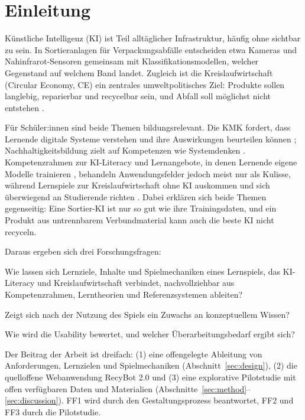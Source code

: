 \documentclass[sigconf,nonacm]{acmart}
\begin{document}
\section{Einleitung}
Künstliche Intelligenz (KI) ist Teil alltäglicher Infrastruktur, häufig ohne sichtbar zu sein. In Sortieranlagen für Verpackungsabfälle entscheiden etwa Kameras und Nahinfrarot-Sensoren gemeinsam mit Klassifikationsmodellen, welcher Gegenstand auf welchem Band landet. Zugleich ist die Kreislaufwirtschaft (Circular Economy, CE) ein zentrales umweltpolitisches Ziel: Produkte sollen langlebig, reparierbar und recycelbar sein, und Abfall soll möglichst nicht entstehen \cite{emf2013,eu2020}.

Für Schüler:innen sind beide Themen bildungsrelevant. Die KMK fordert, dass Lernende digitale Systeme verstehen und ihre Auswirkungen beurteilen können \cite{kmk2016}; Nachhaltigkeitsbildung zielt auf Kompetenzen wie Systemdenken \cite{wiek2011}. Kompetenzrahmen zur KI-Literacy \cite{long2020,touretzky2019,unesco2024} und Lernangebote, in denen Lernende eigene Modelle trainieren \cite{carney2020,lane2021,codeorg2019}, behandeln Anwendungsfelder jedoch meist nur als Kulisse, während Lernspiele zur Kreislaufwirtschaft ohne KI auskommen und sich überwiegend an Studierende richten \cite{lange2022}. Dabei erklären sich beide Themen gegenseitig: Eine Sortier-KI ist nur so gut wie ihre Trainingsdaten, und ein Produkt aus untrennbarem Verbundmaterial kann auch die beste KI nicht recyceln.

Daraus ergeben sich drei Forschungsfragen:

\begin{description}[leftmargin=2.4em,labelwidth=2em,labelsep=0.4em,itemsep=2pt]
\item[FF1] Wie lassen sich Lernziele, Inhalte und Spielmechaniken eines Lernspiels, das KI-Literacy und Kreislaufwirtschaft verbindet, nachvollziehbar aus Kompetenzrahmen, Lerntheorien und Referenzsystemen ableiten?
\item[FF2] Zeigt sich nach der Nutzung des Spiels ein Zuwachs an konzeptuellem Wissen?
\item[FF3] Wie wird die Usability bewertet, und welcher Über\-arbeitungs\-bedarf ergibt sich?
\end{description}

Der Beitrag der Arbeit ist dreifach: (1) eine offengelegte Ableitung von Anforderungen, Lernzielen und Spielmechaniken (Abschnitt~\ref{sec:design}), (2) die quelloffene Webanwendung RecyBot 2.0 und (3) eine explorative Pilotstudie mit offen verfügbaren Daten und Materialien (Abschnitte~\ref{sec:method}--\ref{sec:discussion}). FF1 wird durch den Gestaltungsprozess beantwortet, FF2 und FF3 durch die Pilotstudie.
\end{document}
